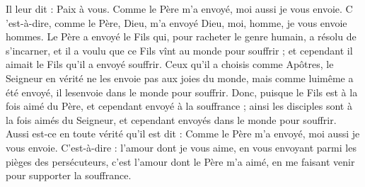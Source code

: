  Il leur dit : Paix à vous. Comme le Père m’a envoyé, moi aussi je vous envoie. C ’est-à-dire, comme le Père, Dieu, m’a envoyé Dieu, moi, homme, je vous envoie hommes. Le Père a envoyé le Fils qui, pour racheter le genre humain, a résolu de s’incarner, et il a voulu que ce Fils vînt au monde pour souffrir ; et cependant il aimait le Fils qu’il a envoyé souffrir. Ceux qu’il a choisis comme Apôtres, le Seigneur en vérité ne les envoie pas aux joies du monde, mais comme luimême a été envoyé, il lesenvoie dans le monde pour souffrir. Donc, puisque le Fils est à la fois aimé du Père, et cependant envoyé à la souffrance ; ainsi les disciples sont à la fois aimés du Seigneur, et cependant envoyés dans le monde pour souffrir. Aussi est-ce en toute vérité qu’il est dit : Comme le Père m'a envoyé, moi aussi je vous envoie. C’est-à-dire : l’amour dont je vous aime, en vous envoyant parmi les pièges des persécuteurs, c’est l’amour dont le Père m’a aimé, en me faisant venir pour supporter la souffrance. 